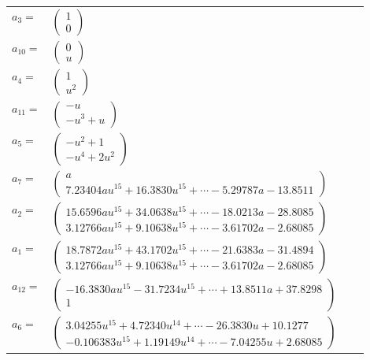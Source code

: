 \documentclass[1p]{elsarticle_modified}
\theoremstyle{definition}
\begin{document}
\begin{tabular}{m{7pt} m{180pt} m{7pt} m{180pt} }
\flushright $a_{3}=$&$\begin{pmatrix}1\\0\end{pmatrix}$ \\
\flushright $a_{10}=$&$\begin{pmatrix}0\\u\end{pmatrix}$ \\
\flushright $a_{4}=$&$\begin{pmatrix}1\\u^2\end{pmatrix}$ \\
\flushright $a_{11}=$&$\begin{pmatrix}- u\\- u^3+u\end{pmatrix}$ \\
\flushright $a_{5}=$&$\begin{pmatrix}- u^2+1\\- u^4+2 u^2\end{pmatrix}$ \\
\flushright $a_{7}=$&$\begin{pmatrix}a\\7.23404 a u^{15}+16.3830 u^{15}+\cdots-5.29787 a-13.8511\end{pmatrix}$ \\
\flushright $a_{2}=$&$\begin{pmatrix}15.6596 a u^{15}+34.0638 u^{15}+\cdots-18.0213 a-28.8085\\3.12766 a u^{15}+9.10638 u^{15}+\cdots-3.61702 a-2.68085\end{pmatrix}$ \\
\flushright $a_{1}=$&$\begin{pmatrix}18.7872 a u^{15}+43.1702 u^{15}+\cdots-21.6383 a-31.4894\\3.12766 a u^{15}+9.10638 u^{15}+\cdots-3.61702 a-2.68085\end{pmatrix}$ \\
\flushright $a_{12}=$&$\begin{pmatrix}-16.3830 a u^{15}-31.7234 u^{15}+\cdots+13.8511 a+37.8298\\1\end{pmatrix}$ \\
\flushright $a_{6}=$&$\begin{pmatrix}3.04255 u^{15}+4.72340 u^{14}+\cdots-26.3830 u+10.1277\\-0.106383 u^{15}+1.19149 u^{14}+\cdots-7.04255 u+2.68085\end{pmatrix}$ \\

\end{tabular}
\end{document}
